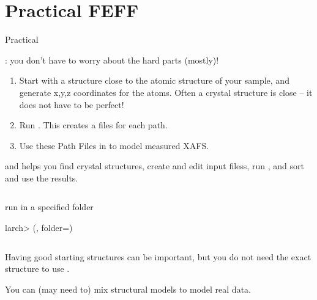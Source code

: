 \section{Practical FEFF}

\begin{slide}{ Practical {\feff} }

    \begin{cenpage}{110mm}

{}: you don't have to worry about the hard parts (mostly)!

\begin{enumerate}
\item Start with a structure close to the {} atomic structure
  of your sample, and generate x,y,z coordinates for the atoms. Often a
  crystal structure is close -- it does not have to be perfect!

\item Run {\feff}.  This creates a {\feffndat} files for each path.

\item Use these  Path Files in to model measured XAFS.
\end{enumerate}

  {\larch} and {\xasviewer} helps you find crystal structures, create and
  edit input filess, run {\feff}, and sort and use the results.

\begin{columns}
      \begin{column}[T]{88mm}
        \begin{block}{ run {\feff} in a specified folder  }
          \begin{semiverbatim} {\footnotesize larch>
{}({}, folder={}) }
          \end{semiverbatim}
        \end{block}

      \end{column}
      \begin{column}[T]{1mm} \end{column}
    \end{columns}


\end{cenpage}

  Having good starting structures can be important, but you do not need the
  exact structure to use {\feff}.

\vmm

  You can (may need to) mix structural models to model real data.

\end{slide}

